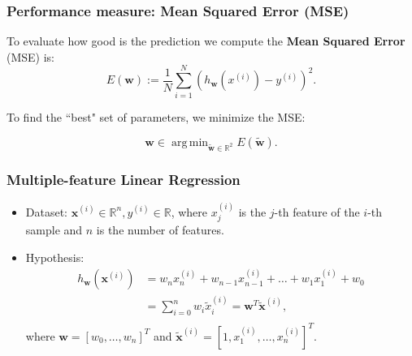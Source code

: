 \documentclass{beamer}
\DeclareMathOperator*{\argmin}{arg\,min}
\begin{document}
	\begin{frame}
		\frametitle{Performance measure: Mean Squared Error (MSE)}
		To evaluate how good is the prediction we compute the \textbf{Mean Squared Error} (MSE) is:
		$$E({\bm{w}}) := \frac{1}{N} \sum_{i=1}^{N} (h_{\bm{w}}(x^{(i)}) - y^{(i)})^2.$$
		
		To find the ``best" set of parameters, we minimize the MSE:
		
		$$\bm{w} \in \argmin_{\tilde{\bm{w}} \in \mathbb{R}^2} E(\tilde{\bm{w}}).$$
		
	\end{frame}


	\begin{frame}
		\frametitle{Multiple-feature Linear Regression}
		
		\begin{itemize}
			\item Dataset: $\bm{x}^{(i)} \in \mathbb{R}^n, y^{(i)} \in \mathbb{R}$, where
			$x^{(i)}_j$ is the $j$-th feature of the $i$-th sample and $n$ is the number of features.
			\item Hypothesis: 
			\begin{align*}
				h_{\bm{w}}(\bm{x}^{(i)}) &= w_{n}x^{(i)}_n + w_{n-1}x^{(i)}_{n-1} + \dots + w_1 x^{(i)}_1 + w_0\\
				&= \sum_{i=0}^n w_i \tilde{x}^{(i)}_i = \bm{w}^T \tilde{\bm{x}}^{(i)},\\
			\end{align*}
			where $\bm{w} = [w_0, \dots, w_n]^T$ and $\tilde{\bm{x}}^{(i)} = [1, x^{(i)}_1, \dots, x^{(i)}_n]^T$.
		\end{itemize}
		
	\end{frame}
\end{document}

